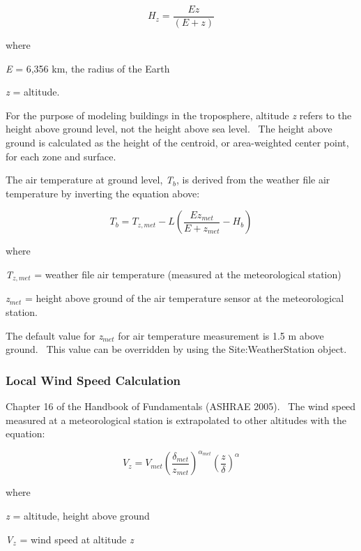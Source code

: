 \begin{equation}
{H_z} = \frac{{Ez}}{{\left( {E + z} \right)}}
\end{equation}

where

\emph{E} = 6,356 km, the radius of the Earth

\emph{z} = altitude.

For the purpose of modeling buildings in the troposphere, altitude \emph{z} refers to the height above ground level, not the height above sea level.~ The height above ground is calculated as the height of the centroid, or area-weighted center point, for each zone and surface.

The air temperature at ground level, \emph{T\(_{b}\)}, is derived from the weather file air temperature by inverting the equation above:

\begin{equation}
{T_b} = {T_{z,met}} - L\left( {\frac{{E{z_{met}}}}{{E + {z_{met}}}} - {H_b}} \right)
\end{equation}

where

\emph{T\(_{z,met}\)} = weather file air temperature (measured at the meteorological station)

\emph{z\(_{met}\)} = height above ground of the air temperature sensor at the meteorological station.

The default value for \emph{z\(_{met}\)} for air temperature measurement is 1.5 m above ground.~ This value can be overridden by using the Site:WeatherStation object.

\subsubsection{Local Wind Speed Calculation}\label{local-wind-speed-calculation}

Chapter 16 of the Handbook of Fundamentals (ASHRAE 2005).~ The wind speed measured at a meteorological station is extrapolated to other altitudes with the equation:

\begin{equation}
{V_z} = {V_{met}}{\left( {\frac{{{\delta_{met}}}}{{{z_{met}}}}} \right)^{{\alpha_{met}}}}{\left( {\frac{z}{\delta }} \right)^\alpha }
\end{equation}

where

\emph{z} = altitude, height above ground

\emph{V\(_{z}\)} = wind speed at altitude \emph{z}

